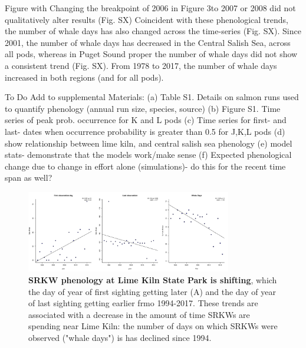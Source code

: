 \documentclass{article}
\begin{document}
\par Figure with Changing the breakpoint of 2006 in Figure 3to 2007 or 2008 did not qualitatively alter results (Fig. SX)
Coincident with these phenological trends, the number of whale days has also changed across the time-series (Fig. SX). Since 2001, the number of whale days has decreased in the Central Salish Sea, across all pods, whereas in Puget Sound proper the number of whale days did not show a consistent trend (Fig. SX). From 1978 to 2017, the number of whale days increased in both regions (and for all pods). 
\par To Do 
Add to supplemental Materials: 
(a) Table S1. Details on salmon runs used to quantify phenology (annual run size, species, source)
(b) Figure S1. Time series of peak prob. occurrence for K and L pods 
(c) Time series for first- and last- dates when occurrence probability is greater than 0.5 for J,K,L pods 
(d) show relationship between lime kiln, and central salish sea phenology
(e) model stats- demonstrate that the models work/make sense 
(f) Expected phenological change due to change in effort alone (simulations)- do this for the recent time span as well?

\begin{figure}[p]
\includegraphics[width=0.8\textwidth]{../analyses/orcaphen/figures/limekilntrends_dat.pdf} 
\caption{\textbf{SRKW phenology at Lime Kiln State Park is shifting}, which the day of year of first sighting getting later (A) and the day of year of last sighting getting earlier frmo 1994-2017. These trends are associated with a decrease in the amount of time SRKWs are spending near Lime Kiln: the number of days on which SRKWs were observed ("whale days") is has declined since 1994. }
\label{fig:limetime}
\end{figure}
\end{document}
